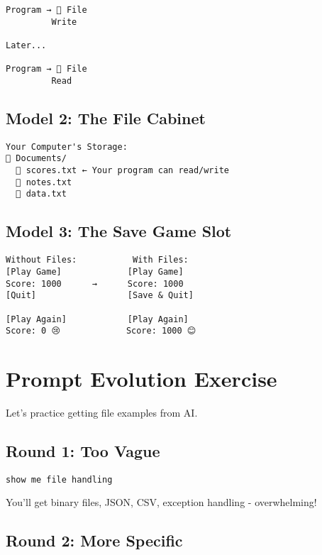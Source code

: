 \documentclass[
  letterpaper,
  DIV=11,
  numbers=noendperiod,
  oneside]{scrreprt}
\begin{document}
\begin{verbatim}
Program → 📓 File
         Write
         
Later...

Program → 📓 File
         Read
\end{verbatim}

\subsection{Model 2: The File Cabinet}\label{model-2-the-file-cabinet}

\begin{verbatim}
Your Computer's Storage:
📁 Documents/
  📄 scores.txt ← Your program can read/write
  📄 notes.txt
  📄 data.txt
\end{verbatim}

\subsection{Model 3: The Save Game
Slot}\label{model-3-the-save-game-slot}

\begin{verbatim}
Without Files:           With Files:
[Play Game]             [Play Game]
Score: 1000      →      Score: 1000
[Quit]                  [Save & Quit]
                        
[Play Again]            [Play Again]
Score: 0 😢             Score: 1000 😊
\end{verbatim}

\section{Prompt Evolution Exercise}\label{prompt-evolution-exercise-7}

Let's practice getting file examples from AI.

\subsection{Round 1: Too Vague}\label{round-1-too-vague-7}

\begin{verbatim}
show me file handling
\end{verbatim}

You'll get binary files, JSON, CSV, exception handling - overwhelming!

\subsection{Round 2: More Specific}\label{round-2-more-specific-6}
\end{document}
